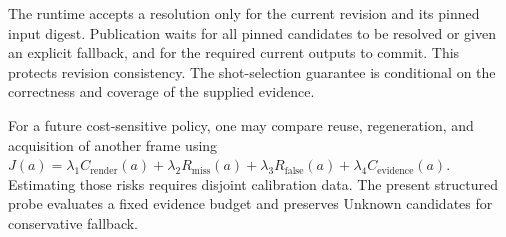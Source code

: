 The runtime accepts a resolution only for the current revision and its
pinned input digest. Publication waits for all pinned candidates to be
resolved or given an explicit fallback, and for the required current
outputs to commit. This protects revision consistency. The shot-selection
guarantee is conditional on the correctness and coverage of the supplied
evidence.

For a future cost-sensitive policy, one may compare reuse, regeneration,
and acquisition of another frame using
\(J(a)=\lambda_1 C_{\mathrm{render}}(a)+\lambda_2R_{\mathrm{miss}}(a)
+\lambda_3R_{\mathrm{false}}(a)+\lambda_4C_{\mathrm{evidence}}(a)\).
Estimating those risks requires disjoint calibration data. The present
structured probe evaluates a fixed evidence budget and preserves Unknown
candidates for conservative fallback.
